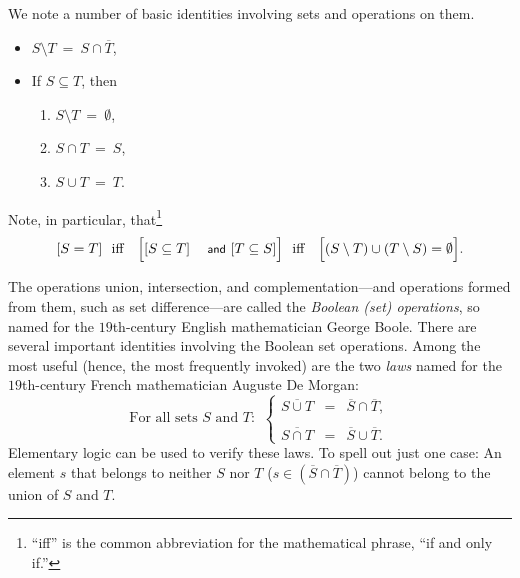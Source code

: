 \bigskip

\noindent
We note a number of basic identities involving sets and operations on them.
\begin{itemize}
\item
$S \setminus T \ = \ S \cap \overline{T}$,
\item
If $S \subseteq T$, then
  \begin{enumerate}
  \item
$S \setminus T \ = \ \emptyset$,
  \item
$S \cap T \ = \ S$,
  \item
$S \cup T \ = \ T$.
  \end{enumerate}
\end{itemize}
Note, in particular, that\footnote{``iff'' is the common abbreviation for the mathematical phrase, ``if and only if.''}
\[ [S = T] \ \mbox{  iff  } \ \ \Bigl[[S \subseteq T] \mbox{
    {\small\sf and} } [T \subseteq S]\Bigr] \ \mbox{  iff  }
\ \ \Bigl[ (S \setminus T) \cup (T \setminus S) = \emptyset\Bigr].
\]

\medskip

 
 
 
The operations union, intersection, and complementation---and operations formed from them, such as set difference---are called the {\em Boolean (set) operations}, so named for the
$19$th-century English mathematician George Boole.  There are several important identities involving the Boolean set operations.  Among the most useful (hence, the most frequently invoked) are the two {\em laws} named for the $19$th-century French mathematician Auguste De Morgan:
\begin{equation}
\label{e.de-morgan}
\mbox{For all sets $S$ and $T$: } \ \left\{
\begin{array}{lcl}
\overline{S \cup T} & = & \overline{S} \cap \overline{T}, \\
 \\
\overline{S \cap T} & = & \overline{S} \cup \overline{T}.
\end{array}
\right.
\end{equation}
Elementary logic can be used to verify these laws.  To spell out just one case: An element $s$ that belongs to neither $S$ nor $T$ ($s \in \left(\overline{S} \cap \overline{T}\right)$) cannot belong to the union of $S$ and $T$.

\bigskip

